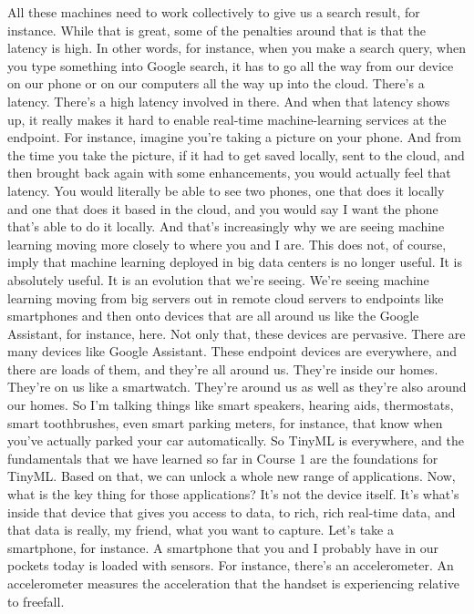 All these machines need to work collectively
to give us a search result, for instance.
While that is great, some of the penalties around that
is that the latency is high.
In other words, for instance, when you make a search query,
when you type something into Google search,
it has to go all the way from our device on our phone or on our computers
all the way up into the cloud.
There's a latency.
There's a high latency involved in there.
And when that latency shows up, it really
makes it hard to enable real-time machine-learning services
at the endpoint.
For instance, imagine you're taking a picture on your phone.
And from the time you take the picture, if it had to get saved locally,
sent to the cloud, and then brought back again with some enhancements,
you would actually feel that latency.
You would literally be able to see two phones, one that does it locally
and one that does it based in the cloud, and you
would say I want the phone that's able to do it locally.
And that's increasingly why we are seeing machine learning moving
more closely to where you and I are.
This does not, of course, imply that machine learning deployed in big data
centers is no longer useful.
It is absolutely useful.
It is an evolution that we're seeing.
We're seeing machine learning moving from big servers
out in remote cloud servers to endpoints like smartphones
and then onto devices that are all around us like the Google Assistant,
for instance, here.
Not only that, these devices are pervasive.
There are many devices like Google Assistant.
These endpoint devices are everywhere, and there are loads of them,
and they're all around us.
They're inside our homes.
They're on us like a smartwatch.
They're around us as well as they're also around our homes.
So I'm talking things like smart speakers, hearing aids, thermostats,
smart toothbrushes, even smart parking meters, for instance,
that know when you've actually parked your car automatically.
So TinyML is everywhere, and the fundamentals
that we have learned so far in Course 1 are the foundations for TinyML.
Based on that, we can unlock a whole new range of applications.
Now, what is the key thing for those applications?
It's not the device itself.
It's what's inside that device that gives you access to data,
to rich, rich real-time data, and that data is really,
my friend, what you want to capture.
Let's take a smartphone, for instance.
A smartphone that you and I probably have in our pockets
today is loaded with sensors.
For instance, there's an accelerometer.
An accelerometer measures the acceleration
that the handset is experiencing relative to freefall.

